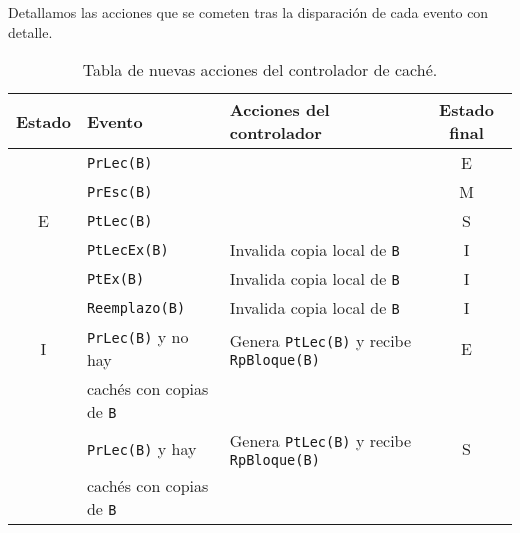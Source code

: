 Detallamos las acciones que se cometen tras la disparación de cada evento con detalle.

\begin{table}
\centering
\begin{tabular}{c l l c}
    \toprule
    Estado & Evento & Acciones del controlador & Estado final \\
    \toprule
       & \verb|PrLec(B)| & & E \\
    \midrule
       & \verb|PrEsc(B)| & & M \\
    \midrule
    E  & \verb|PtLec(B)| & & S \\
    \midrule
       & \verb|PtLecEx(B)| & Invalida copia local de \verb|B| & I \\
    \midrule
       & \verb|PtEx(B)| & Invalida copia local de \verb|B| & I \\
    \midrule
       & \verb|Reemplazo(B)| & Invalida copia local de \verb|B| & I \\
    \bottomrule
    I & \verb|PrLec(B)| y no hay & Genera \verb|PtLec(B)| y recibe \verb|RpBloque(B)| & E \\
      & cachés con copias de \verb|B| & & \\
    \midrule
      & \verb|PrLec(B)| y hay & Genera \verb|PtLec(B)| y recibe \verb|RpBloque(B)| & S \\
      & cachés con copias de \verb|B| & & \\
    \bottomrule
\end{tabular}
\caption{Tabla de nuevas acciones del controlador de caché.}
\label{tab:acciones_controlador_MESI}
\end{table}

